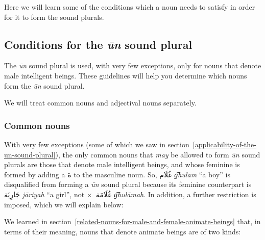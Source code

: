\documentclass[
  10pt,
]{book}
\begin{document}
Here we will learn some of the conditions which a noun needs to satisfy in order for it to form the sound plurals.

\subsection{\texorpdfstring{Conditions for the \emph{ūn} sound plural}{Conditions for the ūn sound plural}}\label{conditions-for-the-un-sound-plural}

The \emph{ūn} sound plural is used, with very few exceptions, only for nouns that denote male intelligent beings. These guidelines will help you determine which nouns form the \emph{ūn} sound plural.

We will treat common nouns and adjectival nouns separately.

\subsubsection{Common nouns}\label{common-nouns}

With very few exceptions (some of which we saw in
section~\ref{applicability-of-the-un-sound-plural}),
the only common nouns that \emph{may} be allowed to form \emph{ūn} sound plurals are those that denote male intelligent beings, and whose feminine is formed by adding a \foreignlanguage{arabic}{ة} to the masculine noun. So, \foreignlanguage{arabic}{غُلَام} \emph{g͡hulām} \enquote{a boy} is disqualified from forming a \emph{ūn} sound plural because its feminine counterpart is \foreignlanguage{arabic}{جَارِيَة} \emph{jāriyah} \enquote{a girl}, not \(\times\)~\foreignlanguage{arabic}{غُلَامَة} \emph{g͡hulāmah}. In addition, a further restriction is imposed, which we will explain below:

We learned in section~\ref{related-nouns-for-male-and-female-animate-beings} that, in terms of their meaning, nouns that denote animate beings are of two kinds:
\end{document}
